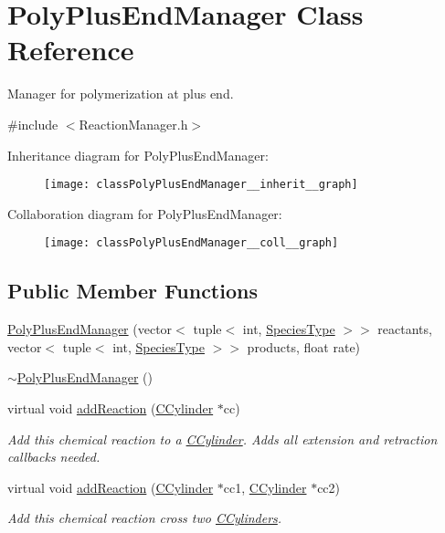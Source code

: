 \hypertarget{classPolyPlusEndManager}{\section{Poly\+Plus\+End\+Manager Class Reference}
\label{classPolyPlusEndManager}
}


Manager for polymerization at plus end.  




{\ttfamily \#include $<$Reaction\+Manager.\+h$>$}



Inheritance diagram for Poly\+Plus\+End\+Manager\+:\nopagebreak
\begin{figure}[H]
\begin{center}
\leavevmode
\texttt{[image: classPolyPlusEndManager\_\_inherit\_\_graph]}
\end{center}
\end{figure}


Collaboration diagram for Poly\+Plus\+End\+Manager\+:
\nopagebreak
\begin{figure}[H]
\begin{center}
\leavevmode
\texttt{[image: classPolyPlusEndManager\_\_coll\_\_graph]}
\end{center}
\end{figure}
\subsection*{Public Member Functions}
\begin{DoxyCompactItemize}
\item 
\hyperlink{classPolyPlusEndManager_a1d8112a3c942f81702b2e9d0c580f792}{Poly\+Plus\+End\+Manager} (vector$<$ tuple$<$ int, \hyperlink{Species_8h_a50651af47c56ea0e27235468d23542cf}{Species\+Type} $>$$>$ reactants, vector$<$ tuple$<$ int, \hyperlink{Species_8h_a50651af47c56ea0e27235468d23542cf}{Species\+Type} $>$$>$ products, float rate)
\item 
\hyperlink{classPolyPlusEndManager_a13ea4cecd6e8b72a30b56f996792ca72}{$\sim$\+Poly\+Plus\+End\+Manager} ()
\item 
virtual void \hyperlink{classPolyPlusEndManager_a735f37d5d635849af7ea522798e4384f}{add\+Reaction} (\hyperlink{classCCylinder}{C\+Cylinder} $\ast$cc)
\begin{DoxyCompactList}\small\item\em Add this chemical reaction to a \hyperlink{classCCylinder}{C\+Cylinder}. Adds all extension and retraction callbacks needed. \end{DoxyCompactList}\item 
virtual void \hyperlink{classPolyPlusEndManager_ac5d5bf1e5971c9499d124692267e31b7}{add\+Reaction} (\hyperlink{classCCylinder}{C\+Cylinder} $\ast$cc1, \hyperlink{classCCylinder}{C\+Cylinder} $\ast$cc2)
\begin{DoxyCompactList}\small\item\em Add this chemical reaction cross two \hyperlink{classCCylinder}{C\+Cylinders}. \end{DoxyCompactList}\end{DoxyCompactItemize}
